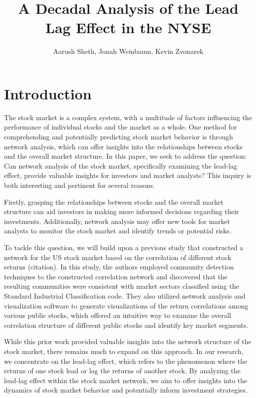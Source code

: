 \documentclass{article}
\title{A Decadal Analysis of the Lead Lag Effect in the NYSE}
\author{%
  Aarush Sheth, Jonah Weinbaum, Kevin Zvonarek} \\}
\begin{document}
\maketitle





\section{Introduction}

The stock market is a complex system, with a multitude of factors influencing the performance of individual stocks and the market as a whole. One method for comprehending and potentially predicting stock market behavior is through network analysis, which can offer insights into the relationships between stocks and the overall market structure. In this paper, we seek to address the question: Can network analysis of the stock market, specifically examining the lead-lag effect, provide valuable insights for investors and market analysts? This inquiry is both interesting and pertinent for several reasons.

Firstly, grasping the relationships between stocks and the overall market structure can aid investors in making more informed decisions regarding their investments. Additionally, network analysis may offer new tools for market analysts to monitor the stock market and identify trends or potential risks.

To tackle this question, we will build upon a previous study that constructed a network for the US stock market based on the correlation of different stock returns (citation). In this study, the authors employed community detection techniques to the constructed correlation network and discovered that the resulting communities were consistent with market sectors classified using the Standard Industrial Classification  code. They also utilized network analysis and visualization software to generate visualizations of the return correlations among various public stocks, which offered an intuitive way to examine the overall correlation structure of different public stocks and identify key market segments.

While this prior work provided valuable insights into the network structure of the stock market, there remains much to expand on this approach. In our research, we  concentrate on the lead-lag effect, which refers to the phenomenon where the returns of one stock lead or lag the returns of another stock. By analyzing the lead-lag effect within the stock market network, we aim to offer insights into the dynamics of stock market behavior and potentially inform investment strategies.
\end{document}
